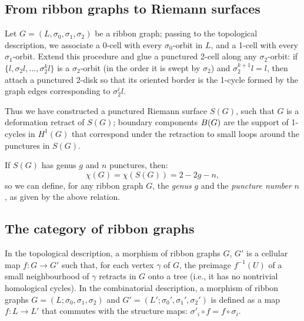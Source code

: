 \subsection{From ribbon graphs to Riemann surfaces}
\label{sec:rg-to-surfaces}

Let $G = (L, \sigma_0, \sigma_1, \sigma_2)$ be a ribbon graph; passing to the
topological description, we associate a 0-cell with every $\sigma_0$-orbit
in $L$, and a 1-cell with every $\sigma_1$-orbit.  Extend this procedure
and glue a punctured 2-cell along any $\sigma_2$-orbit: if $\{l, \sigma_2l, \ldots,
\sigma_2^kl\}$ is a $\sigma_2$-orbit (in the order it is swept by $\sigma_2$) and
$\sigma_2^{k+1}l = l$, then attach a punctured 2-disk so that its oriented
border is the 1-cycle formed by the graph edges corresponding to
$\sigma_2^il$.  

Thus we have constructed a punctured Riemann surface $S(G)$, such that
$G$ is a deformation retract of $S(G)$; boundary components
$B(G)$ are the support of 1-cycles in $H^1(G)$ that correspond
under the retraction to small loops around the punctures in $S(G)$.

If $S(G)$ has genus $g$ and $n$ punctures, then:
\begin{equation*}
  \chi(G) = \chi(S(G)) = 2 - 2g - n,
\end{equation*}
so we can define, for any ribbon graph $G$, the \emph{genus} $g$ and the
\emph{puncture number} $n$, as given by the above relation.


\subsection{The category of ribbon graphs}
\label{sec:rg-category}

In the topological description, a morphism of ribbon graphs $G$, $G'$
is a cellular map $f:G\to G'$ such that, for each vertex $\gamma$ of $G$, the
preimage $f^{-1}(U)$ of a small neighbourhood of $\gamma$ retracts in $G$
onto a tree (i.e., it has no nontrivial homological cycles).  In the
combinatorial description, a morphism of ribbon graphs $G = (L; \sigma_0,
\sigma_1, \sigma_2)$ and $G' = (L'; \sigma_0', \sigma_1', \sigma_2')$ is defined as a map
$f:L\to L'$ that commutes with the structure maps: $\sigma'_i\circ f = f\circ\sigma_i$.

